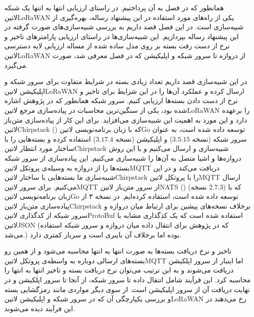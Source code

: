 
همانطور که در فصل  به آن پرداختیم.
در راستای ارزیابی انتها به انتها یک شبکه ‌لاتین{LoRaWAN} یکی از راه‌های مورد استفاده در این پیشنهاد رساله،
بهره‌گیری از شبیه‌سازی است.
در این فصل قصد داریم به بررسی شبیه‌سازی‌های صورت گرفته در این پیشنهاد رساله بپردازیم.
این شبیه‌سازی‌ها در راستای ارزیابی پارامترهای تاخیر و نرخ از دست رفت بسته بر روی مدل ساده شده از مساله
ارزیابی لایه دسترسی ‌لاتین{LoRaWAN} از دروازه تا سرور شبکه و اپلیکیشن که در فصل 
معرفی شد، صورت می‌گیرد.


در این شبیه‌سازی قصد داریم تعداد زیادی بسته در شرایط متفاوت برای سرور شبکه و اپلیکیشن ‌لاتین{LoRaWAN} ارسال کرده و
عملکرد آن‌ها را در این شرایط برای تاخیر و نرخ از دست دادن بسته‌ها ارزیابی کنیم.
سرور شبکه همانطور که در پژوهش  اشاره شده بود، یکی از سنگین‌ترین محاسبات در پیاده‌سازی مرجع ‌لاتین{LoRaWAN} را برعهده دارد و این مورد به
اهمیت این شبیه‌سازی می‌افزاید.
برای این کار از پیاده‌سازی متن‌باز ‌لاتین{Chirpstack} () که با زبان برنامه‌نویسی ‌لاتین{Go} توسعه داده شده است،
به عنوان سرور شبکه (نسخه $3.5.15$) و اپلیکیشن (نسخه $3.17.4$) استفاده کرده و بسته‌هایی را با ساختار مورد انتظار
‌لاتین{Chirpstack} شبیه‌سازی و ارسال می‌کنیم و با این روش دروازه‌ها و اشیا متصل به آن‌ها را شبیه‌سازی می‌کنیم.
این پیاده‌سازی از سرور شبکه بسته‌ها را از دروازه به وسیله‌ی پروتکل ‌لاتین{MQTT} دریافت می‌کند و در این شبیه‌سازی ما بسته‌هایی با ساختار ‌لاتین{Chirpstack}
را با پروتکل ‌لاتین{MQTT} ارسال می‌کنیم. برای سرور ‌لاتین{MQTT} از سرور متن‌باز ‌لاتین{NATS} () (نسخه $2.7.3$)
که با زبان برنامه‌نویسی ‌لاتین{Go} توسعه داده شده است، استفاده کرده‌ایم.
در نسخه ۳ از پیاده‌سازی متن‌باز ‌لاتین{Chirpstack} برخلاف نسخه‌های پیشین برای ارتباط میان دروازه و سرور شبکه از کدگذاری ‌لاتین{ProtoBuf} استفاده شده است که یک
کدگذاری مشابه با ‌لاتین{JSON} (که در پژوهش  برای انتقال داده میان دروازه و سرور شبکه استفاده می‌شد.) بوده اما برخلاف آن باینری است و سربار کمتری دارد.

تاخیر و نرخ دریافت بسته‌ها به صورت انتها به انتها محاسبه می‌شود و از همین رو بسته‌های ارسالی دوباره به واسطه‌ی پروتکل ‌لاتین{MQTT} اما اینبار از سرور اپلکیشن
دریافت می‌شوند و به این ترتیب می‌توان نرخ دریافت بسته و تاخیر انتها به انتها را محاسبه کرد. این فرآیند شامل انتقال داده تا سرور شبکه، از آنجا تا سرور اپلکیشن و در نهایت
دریافت آن از سرور اپلیکیشن است. از سوی دیگر مواردی مانند رمزگشایی بسته و بررسی یکپارچگی آن که در سرور شبکه و اپلیکیشن ‌لاتین{LoRaWAN} رخ می‌دهند در این فرآیند دیده می‌شوند.

